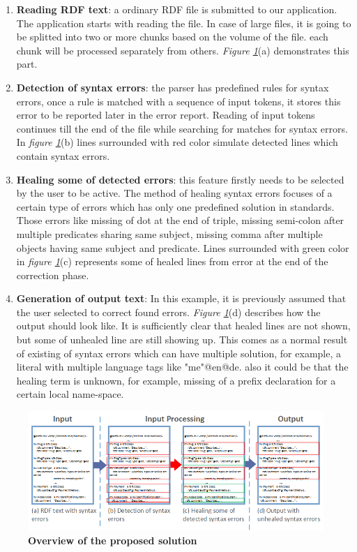  \begin{enumerate}[label=(\alph*)]
\item \textbf{Reading RDF text}: a ordinary RDF file is submitted to our application. The application starts with reading the file. In case of large files, it is going to be splitted into two or more chunks based on the volume of the file. each chunk will be processed separately from others.  {\it Figure \ref{Fig:Approach}}(a) demonstrates this part. 
\item \textbf{Detection of syntax errors}: the parser has predefined rules for syntax errors, once a rule is matched with a sequence of input tokens, it stores this error to be reported later in the error report. Reading of input tokens continues till the end of the file while searching for matches for syntax errors. In  {\it figure \ref{Fig:Approach}}(b) lines surrounded with red color simulate detected lines which contain syntax errors. 
\item \textbf {Healing some of detected errors}: this feature firstly needs to be selected by the user to be active. The method of healing syntax errors focuses of a certain type of errors which has only one predefined solution in standards. Those errors like missing of dot at the end of triple, missing semi-colon after multiple predicates sharing same subject, missing comma after multiple objects having same subject and predicate. Lines surrounded with green color in {\it figure \ref{Fig:Approach}}(c) represents some of healed lines from error at the end of the correction phase.  
\item\textbf {Generation of output text}: In this example, it is previously assumed that the user selected to correct found errors.  {\it Figure \ref{Fig:Approach}}(d) describes how the output should look like. It is sufficiently clear that healed lines are not shown, but some of unhealed line are still showing up. This comes as a normal result of existing of syntax errors which can have multiple solution, for example, a literal with multiple language tags like "me"@en@de. also it could be that the healing term is unknown, for example, missing of a prefix declaration for a certain local name-space. 
\end{enumerate} 

\begin{figure}
	\centering
	  	\includegraphics[width=13cm]{images/Approach.png}
		\caption{\textbf{Overview of the proposed solution}}
		\label{Fig:Approach}  
\end{figure}
